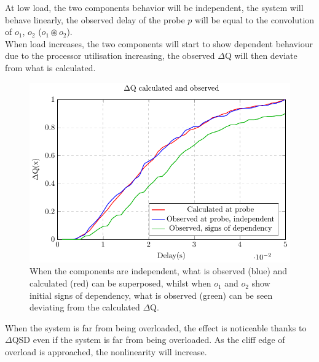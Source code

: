         At low load, the two components behavior will be independent, the system will behave linearly, the observed delay of the probe $p$ will be equal to the convolution of $o_1$, $o_2$ ($o_1 \circledast o_2$). \\
        When load increases, the two components will start to show dependent behaviour due to the processor utilisation increasing, the observed $\Delta$Q will then deviate from what is calculated.
        \begin{figure}[H]
            \begin{center}
                \includegraphics[scale=1.2]{tikz/cdf_indep.pdf}
            \end{center}
            \caption{When the components are independent, what is observed (blue) and calculated (red) can be superposed, whilst when $o_1$ and $o_2$ show initial signs of dependency, what is observed (green) can be seen deviating from the calculated $\Delta$Q.}
        \end{figure}
        When the system is far from being overloaded, the effect is noticeable thanks to $\Delta$QSD even if the system is far from being overloaded. As the cliff edge of overload is approached, the nonlinearity will increase.
